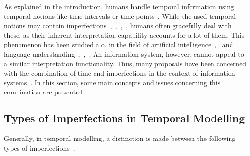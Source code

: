 %
%
As explained in the introduction, humans handle temporal information using temporal notions like time intervals or time points~\cite{Dyreson1994}. While the used temporal notions may contain imperfections~\cite{Dev98},~\cite{Dubois:jucs_9_9:fuzziness_and_uncertainty_in},~\cite{nagypal2003},~\cite{Dubois89}, humans often gracefully deal with these, as their inherent interpretation capability accounts for a lot of them. This phenomenon has been studied a.o. in the field of artificial intelligence~\cite{Tre97},~\cite{5151} and language understanding~\cite{DeCaluwe:1997:FTI:285506.285516},~\cite{nagypal2003},~\cite{Dev98}. An information system, however, cannot appeal to a similar interpretation functionality. Thus, many proposals have been concerned with the combination of time and imperfections in the context of information systems~\cite{nagypal2003}. In this section, some main concepts and issues concerning this combination are presented.



\subsection{Types of Imperfections in Temporal Modelling}
Generally, in temporal modelling, a distinction is made between the following types of imperfections~\cite{nagypal2003}.



